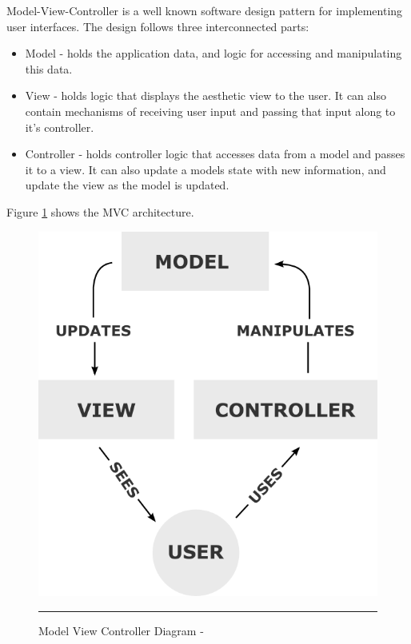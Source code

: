 Model-View-Controller is a well known software design pattern for implementing user interfaces. The design follows three interconnected parts:

\begin{itemize}
	\item Model - holds the application data, and logic  for accessing and manipulating this data.
	\item View - holds logic that displays the aesthetic view to the user. It can also contain mechanisms of receiving user input and passing that input along to it's controller.
	\item Controller - holds controller logic that accesses data from a model and passes it to a view. It can also update a models state with new information, and update the view as the model is updated.
\end{itemize}

Figure \ref{fig:mvc} shows the MVC architecture.

\begin{figure}[htbp]
	\centering
\includegraphics[width=\textwidth,height=\textheight,keepaspectratio]{Figures/MVC.png}	
		\rule{35em}{0.5pt}
	\caption[Model View Controller Diagram - \cite{wikiMVC}]{Model View Controller Diagram - \cite{wikiMVC}}
	\label{fig:mvc}
\end{figure}

